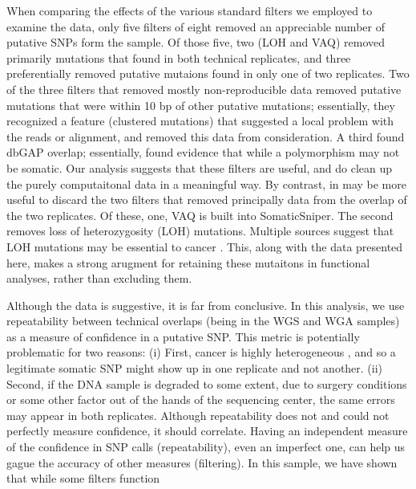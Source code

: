 \documentclass[11pt]{article} %
\begin{document}
When comparing the effects of the various standard filters we employed to examine the data, only five filters of eight removed an appreciable number of putative SNPs form the sample. Of those five, two (LOH and VAQ) removed primarily mutations that found in both technical replicates, and three preferentially removed putative mutaions found in only one of two replicates. Two of the three filters that removed mostly non-reproducible data removed putative mutations that were within 10 bp of other putative mutations; essentially, they recognized a feature (clustered mutations) that suggested a local problem with the reads or alignment, and removed this data from consideration. A third found dbGAP overlap; essentially, found evidence that while a polymorphism may not be somatic. Our analysis suggests that these filters are useful, and do clean up the purely computaitonal data in a meaningful way.
By contrast, in may be more useful to discard the two filters that removed principally data from the overlap of the two replicates. Of these, one, VAQ is built into SomaticSniper. The second removes loss of heterozygosity (LOH) mutations. Multiple sources suggest that LOH mutations may be essential to cancer \cite{LOH}. This, along with the data presented here, makes a strong arugment for retaining these mutaitons in functional analyses, rather than excluding them.

Although the data is suggestive, it is far from conclusive. In this analysis, we use repeatability between technical overlaps (being in the WGS and WGA samples) as a measure of confidence in a putative SNP. This metric is potentially problematic for two reasons:
(i) First, cancer is highly heterogeneous \cite{hetero}, and so a legitimate somatic SNP might show up in one replicate and not another.
(ii) Second, if the DNA sample is degraded to some extent, due to surgery conditions or some other factor out of the hands of the sequencing center, the same errors may appear in both replicates. Although repeatability does not and could not perfectly measure confidence, it should correlate. Having an independent measure of the confidence in SNP calls (repeatability), even an imperfect one, can help us gague the accuracy of other measures (filtering).  
In this sample, we have shown that while some filters function 
\end{document}
